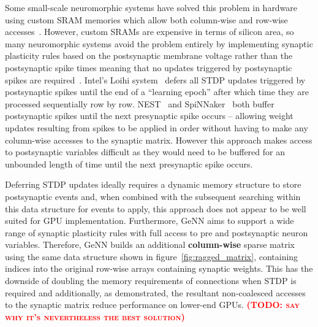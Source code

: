 \documentclass[utf8]{frontiersSCNS} %
\newcommand{\todo}[1]{\textbf{\textsc{\textcolor{red}{(TODO: #1)}}}}
\begin{document}
Some small-scale neuromorphic systems have solved this problem in hardware using custom SRAM memories which allow both column-wise and row-wise accesses~\citep{Seo2011}.
However, custom SRAMs are expensive in terms of silicon area, so many neuromorphic systems avoid the problem entirely by implementing synaptic plasticity rules based on the postsynaptic membrane voltage rather than the postsynaptic spike times meaning that  no updates triggered by postsynaptic spikes are required~\citep{Frenkel2018,Qiao2015}.
Intel's Loihi system~\citep{Davies2018} defers all STDP updates triggered by postsynaptic spikes until the end of a ``learning epoch'' after which time they are processed sequentially row by row.
NEST~\citep{Morrison2007} and SpiNNaker~\citep{Knight2016} both buffer postsynaptic spikes until the next presynaptic spike occurs -- allowing weight updates resulting from spikes to be applied in order without having to make any column-wise accesses to the synaptic matrix. 
However this approach makes access to postsynaptic variables difficult as they would need to be buffered for an unbounded length of time until the next presynaptic spike occurs.

Deferring STDP updates ideally requires a dynamic memory structure to store postsynaptic events and, when combined with the subsequent searching within this data structure for events to apply, this approach does not appear to be well suited for GPU implementation.
Furthermore, GeNN aims to support a wide range of synaptic plasticity rules with full access to pre and postsynaptic neuron variables.
Therefore, GeNN builds an additional \textbf{column-wise} sparse matrix using the same data structure shown in figure~\ref{fig:ragged_matrix}, containing indices into the original row-wise arrays containing synaptic weights.
This has the downside of doubling the memory requirements of connections when STDP is required and additionally, as \citet{Yavuz2016} demonstrated, the resultant non-coalesced accesses to the synaptic matrix reduce performance on lower-end GPUs. \todo{say why it's nevertheless the best solution}
\end{document}
